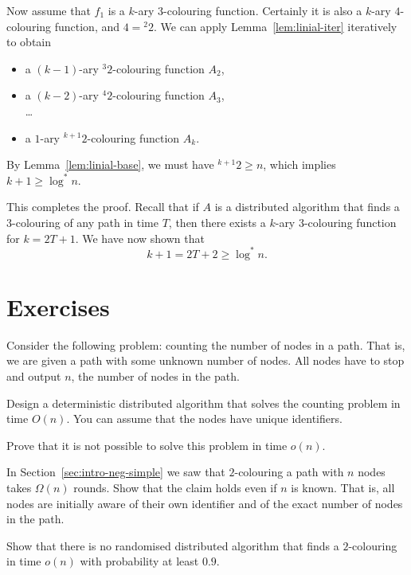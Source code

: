 Now assume that $f_1$ is a $k$-ary $3$-colouring function. Certainly it is also a $k$-ary $4$-colouring function, and $4 = {}^2 2$. We can apply Lemma~\ref{lem:linial-iter} iteratively to obtain
\begin{itemize}[noitemsep]
    \item a $(k-1)$-ary ${}^3 2$-colouring function $A_2$,
    \item a $(k-2)$-ary ${}^4 2$-colouring function $A_3$, \\ \ldots
    \item a $1$-ary ${}^{k+1} 2$-colouring function $A_k$.
\end{itemize}
By Lemma~\ref{lem:linial-base}, we must have ${}^{k+1} 2 \ge n$, which implies $k + 1 \ge \log^* n$.

This completes the proof. Recall that if $A$ is a distributed algorithm that finds a $3$-colouring of any path in time $T$, then there exists a $k$-ary $3$-colouring function for $k = 2T+1$. We have now shown that
\[
    k + 1 = 2T + 2 \ge \log^* n.
\]


\section{Exercises}

\begin{ex}[counting]
    Consider the following problem: counting the number of nodes in a path. That is, we are given a path with some unknown number of nodes. All nodes have to stop and output $n$, the number of nodes in the path.
    \begin{subex}
        \item Design a deterministic distributed algorithm that solves the counting problem in time $O(n)$. You can assume that the nodes have unique identifiers.
        \item Prove that it is not possible to solve this problem in time $o(n)$.
    \end{subex}
\end{ex}

\begin{ex}[known $n$]
    In Section~\ref{sec:intro-neg-simple} we saw that $2$-colouring a path with $n$ nodes takes $\Omega(n)$    rounds. Show that the claim holds even if $n$ is known. That is, all nodes are initially aware of their own identifier and of the exact number of nodes in the path.
\end{ex}

\begin{ex}
    Show that there is no randomised distributed algorithm that finds a $2$-colouring in time $o(n)$ with probability at least $0.9$.
\end{ex}

